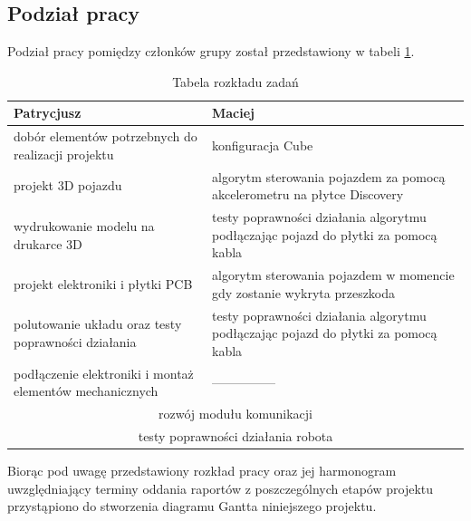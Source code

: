 \documentclass[10pt, a4paper]{article}
\begin{document}
\newpage
\subsection{Podział pracy}
Podział pracy pomiędzy członków grupy został przedstawiony w tabeli \ref{tab:Tabela rozkladu pracy}.

\begin{table}[H]
	\centering
	\begin{tabular}{|p{7.8cm}|p{7.8cm}|} \hline

		\textbf{Patrycjusz } & \textbf{Maciej} \\ \hline \hline
		dobór elementów potrzebnych do realizacji projektu & konfiguracja Cube \\ \hline
		projekt 3D pojazdu & algorytm sterowania pojazdem za pomocą akcelerometru na płytce Discovery \\ \hline
		wydrukowanie modelu na drukarce 3D & testy poprawności działania algorytmu podłączając pojazd do płytki za pomocą kabla \\ \hline
		projekt elektroniki i płytki PCB &  algorytm sterowania pojazdem w momencie gdy zostanie wykryta przeszkoda  \\ \hline
		polutowanie układu oraz testy poprawności działania &  testy poprawności działania algorytmu podłączając pojazd do płytki za pomocą kabla \\ \hline
		podłączenie elektroniki i montaż elementów mechanicznych &--------------- \\ \hline
		\multicolumn{2}{|c|}{rozwój modułu komunikacji} \\ \hline
		\multicolumn{2}{|c|}{testy poprawności działania robota} \\ \hline
	\end{tabular}
	\caption{Tabela rozkładu zadań}	
	\label{tab:Tabela rozkladu pracy}
\end{table}

\noindent Biorąc pod uwagę przedstawiony rozkład pracy oraz jej harmonogram uwzględniający terminy oddania raportów z poszczególnych etapów projektu przystąpiono do stworzenia diagramu Gantta niniejszego projektu.
\end{document}
